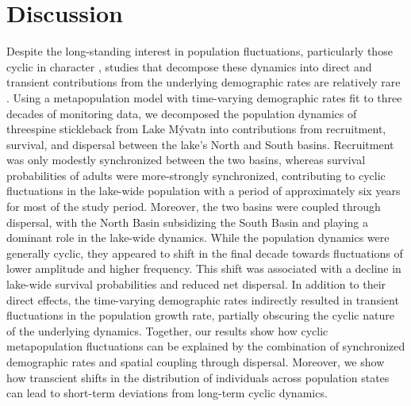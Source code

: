 \documentclass[11pt]{article}
\begin{document}



\section*{Discussion}

Despite the long-standing interest in population fluctuations,
particularly those cyclic in character 
\citep{elton1924, nicholson1935},
studies that decompose these dynamics into direct and transient contributions 
from the underlying demographic rates are relatively rare 
\citep{fox2000population, coulson2005decomposing, koons2017understanding}.
Using a metapopulation model with time-varying demographic rates 
fit to three decades of monitoring data,
we decomposed the population dynamics of threespine stickleback from Lake M\'{y}vatn
into contributions from recruitment, survival, and dispersal 
between the lake's North and South basins.
Recruitment was only modestly synchronized between the two basins, 
whereas survival probabilities of adults were more-strongly synchronized, 
contributing to cyclic fluctuations in the lake-wide population with a period 
of approximately six years for most of the study period. 
Moreover, the two basins were coupled through dispersal, 
with the North Basin subsidizing the South Basin 
\citep[i.e., ``source-sink dynamics'';][]{pulliam1988}
and playing a dominant role in the lake-wide dynamics.
While the population dynamics were generally cyclic, 
they appeared to shift in the final decade towards fluctuations 
of lower amplitude and higher frequency. 
This shift was associated with a decline in lake-wide survival probabilities 
and reduced net dispersal. 
In addition to their direct effects, 
the time-varying demographic rates indirectly resulted in transient fluctuations 
in the population growth rate, 
partially obscuring the cyclic nature of the underlying dynamics. 
Together, our results show how cyclic metapopulation fluctuations can be explained by the combination of synchronized demographic rates and spatial coupling through dispersal. 
Moreover, we show how transcient shifts in the distribution of individuals 
across population states can lead to short-term deviations 
from long-term cyclic dynamics.
\end{document}
